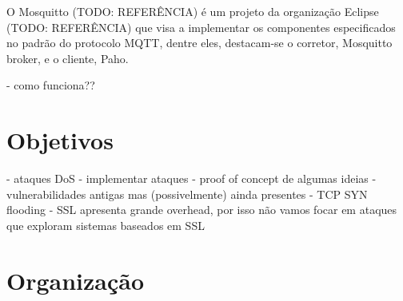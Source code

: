O Mosquitto (TODO: REFERÊNCIA) é um projeto da organização Eclipse (TODO: REFERÊNCIA) que visa a implementar os componentes especificados no padrão do protocolo MQTT, dentre eles, destacam-se o corretor, Mosquitto broker, e o cliente, Paho.

- como funciona??








\section{Objetivos}

- ataques DoS
- implementar ataques
- proof of concept de algumas ideias
- vulnerabilidades antigas mas (possivelmente) ainda presentes
- TCP SYN flooding
- SSL apresenta grande overhead, por isso não vamos focar em ataques que exploram sistemas baseados em SSL



\section{Organização}


